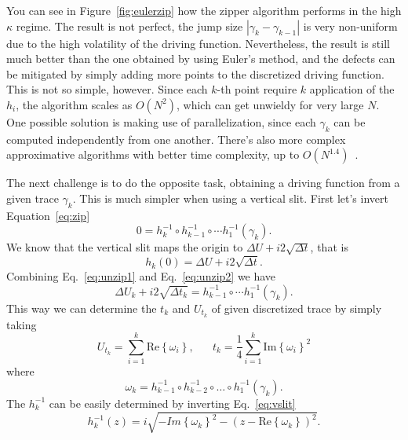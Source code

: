 You can see in Figure~\ref{fig:eulerzip} how the zipper algorithm performs in
the high $\kappa$ regime. The result is not perfect, the jump size
$\left|\gamma_{k}-\gamma_{k-1}\right|$ is very non-uniform due to the high
volatility of the driving function. Nevertheless, the result is still much
better than the one obtained by using Euler's method, and the defects can be
mitigated by simply adding more points to the discretized driving function.
This is not so simple, however. Since each $k$-th point require $k$ application
of the $h_i$, the algorithm scales as $O(N^2)$, which can get unwieldy for very
large $N$. One possible solution is making use of parallelization, since each
$\gamma_k$ can be computed independently from one another. There's also more
complex approximative algorithms with better time complexity, up to
$O(N^{1.4})$~\cite{Kennedy2007}.

The next challenge is to do the opposite task, obtaining a driving function
from a given trace $\gamma_k$. This is much simpler when using a vertical slit.
First let's invert Equation~\ref{eq:zip}
\begin{equation}
    \label{eq:unzip1}
    0=h_{k}^{-1}\circ h_{k-1}^{-1}\circ\cdots h_{1}^{-1}\left(\gamma_{k}\right).
\end{equation}
We know that the vertical slit maps the origin to $\Delta U+i2\sqrt{\Delta t}$,
that is
\begin{equation}
    \label{eq:unzip2}
    h_{k}\left(0\right)=\Delta U+i2\sqrt{\Delta t}.
\end{equation}
Combining Eq.~\ref{eq:unzip1} and Eq.~\ref{eq:unzip2} we have    
\begin{equation}
    \Delta U_{k}+i2\sqrt{\Delta t_{k}}=
    h_{k-1}^{-1}\circ\cdots h_{1}^{-1}\left(\gamma_{k}\right).
\end{equation}
This way we can determine the $t_k$ and $U_{t_k}$ of given discretized
trace by simply taking
\begin{equation}
    \label{eq:unzip1}
    U_{t_k}=\sum_{i=1}^{k}\mbox{Re}\left\{ \omega_{i}\right\},
    \,\,\,\,\,\,\,\,\,\,
    t_{k}=\frac{1}{4}\sum_{i=1}^{k}\mbox{Im}\left\{ \omega_{i}\right\} ^{2}
\end{equation}
where
\begin{equation}
    \omega_{k}=h_{k-1}^{-1}\circ h_{k-2}^{-1}\circ
        \ldots\circ h_{1}^{-1}\left(\gamma_{k}\right).
\end{equation}
The $h_k^{-1}$ can be easily determined by inverting Eq.~\ref{eq:vslit}
\begin{equation}
    h_{k}^{-1}\left(z\right)=
    i\sqrt{-Im{\left\{ \omega_{k}\right\}}^{2}
           -{\left(z-\mbox{Re}\left\{ \omega_{k}\right\} \right)}^{2}}.
\end{equation}

